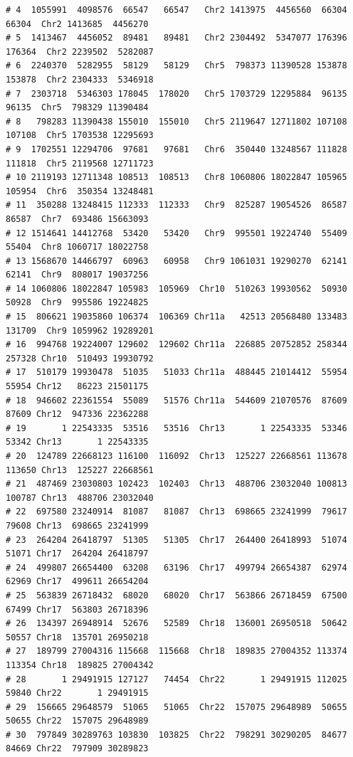 \documentclass{article}\usepackage[]{graphicx}\usepackage[]{color}
\makeatletter
\newenvironment{kframe}{%
 \def\at@end@of@kframe{}%
 \ifinner\ifhmode%
  \def\at@end@of@kframe{\end{minipage}}%
  \begin{minipage}{\columnwidth}%
 \fi\fi%
 \def\FrameCommand##1{\hskip\@totalleftmargin \hskip-\fboxsep
 \colorbox{shadecolor}{##1}\hskip-\fboxsep
     \hskip-\linewidth \hskip-\@totalleftmargin \hskip\columnwidth}%
 \MakeFramed {\advance\hsize-\width
   \@totalleftmargin\z@ \linewidth\hsize
   \@setminipage}}%
 {\par\unskip\endMakeFramed%
 \at@end@of@kframe}
\newenvironment{knitrout}{}{} %
\makeatother
\begin{document}
\begin{knitrout}
\begin{kframe}
\begin{verbatim}
# 4  1055991  4098576  66547   66547   Chr2 1413975  4456560  66304   66304  Chr2 1413685  4456270
# 5  1413467  4456052  89481   89481   Chr2 2304492  5347077 176396  176364  Chr2 2239502  5282087
# 6  2240370  5282955  58129   58129   Chr5  798373 11390528 153878  153878  Chr2 2304333  5346918
# 7  2303718  5346303 178045  178020   Chr5 1703729 12295884  96135   96135  Chr5  798329 11390484
# 8   798283 11390438 155010  155010   Chr5 2119647 12711802 107108  107108  Chr5 1703538 12295693
# 9  1702551 12294706  97681   97681   Chr6  350440 13248567 111828  111818  Chr5 2119568 12711723
# 10 2119193 12711348 108513  108513   Chr8 1060806 18022847 105965  105954  Chr6  350354 13248481
# 11  350288 13248415 112333  112333   Chr9  825287 19054526  86587   86587  Chr7  693486 15663093
# 12 1514641 14412768  53420   53420   Chr9  995501 19224740  55409   55404  Chr8 1060717 18022758
# 13 1568670 14466797  60963   60958   Chr9 1061031 19290270  62141   62141  Chr9  808017 19037256
# 14 1060806 18022847 105983  105969  Chr10  510263 19930562  50930   50928  Chr9  995586 19224825
# 15  806621 19035860 106374  106369 Chr11a   42513 20568480 133483  131709  Chr9 1059962 19289201
# 16  994768 19224007 129602  129602 Chr11a  226885 20752852 258344  257328 Chr10  510493 19930792
# 17  510179 19930478  51035   51033 Chr11a  488445 21014412  55954   55954 Chr12   86223 21501175
# 18  946602 22361554  55089   51576 Chr11a  544609 21070576  87609   87609 Chr12  947336 22362288
# 19       1 22543335  53516   53516  Chr13       1 22543335  53346   53342 Chr13       1 22543335
# 20  124789 22668123 116100  116092  Chr13  125227 22668561 113678  113650 Chr13  125227 22668561
# 21  487469 23030803 102423  102403  Chr13  488706 23032040 100813  100787 Chr13  488706 23032040
# 22  697580 23240914  81087   81087  Chr13  698665 23241999  79617   79608 Chr13  698665 23241999
# 23  264204 26418797  51305   51305  Chr17  264400 26418993  51074   51071 Chr17  264204 26418797
# 24  499807 26654400  63208   63196  Chr17  499794 26654387  62974   62969 Chr17  499611 26654204
# 25  563839 26718432  68020   68020  Chr17  563866 26718459  67500   67499 Chr17  563803 26718396
# 26  134397 26948914  52676   52589  Chr18  136001 26950518  50642   50557 Chr18  135701 26950218
# 27  189799 27004316 115668  115668  Chr18  189835 27004352 113374  113354 Chr18  189825 27004342
# 28       1 29491915 127127   74454  Chr22       1 29491915 112025   59840 Chr22       1 29491915
# 29  156665 29648579  51065   51065  Chr22  157075 29648989  50655   50655 Chr22  157075 29648989
# 30  797849 30289763 103830  103825  Chr22  798291 30290205  84677   84669 Chr22  797909 30289823

\end{verbatim}
\end{kframe}
\end{knitrout}
\end{document}
